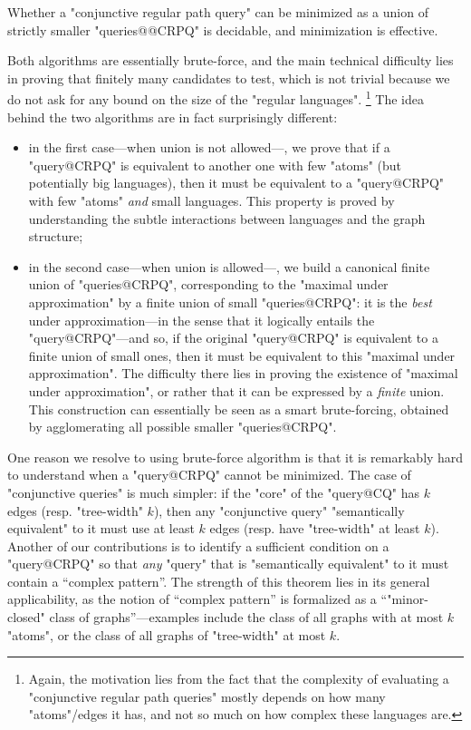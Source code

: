 \begin{contribution}
	Whether a "conjunctive regular path query" can be minimized
	as a union of strictly smaller "queries@@CRPQ" is decidable,
	and minimization is effective.
\end{contribution}

Both algorithms are essentially brute-force, and the main technical difficulty
lies in proving that finitely many candidates to test, which is not
trivial because we do not ask for any bound on the size of the "regular languages".%
\footnote{Again, the motivation lies from the fact that the complexity of evaluating
a "conjunctive regular path queries" mostly depends on how many "atoms"/edges it has,
and not so much on how complex these languages are.}
The idea behind the two algorithms are in fact surprisingly different:
\begin{itemize}
	\item in the first case---when union is not allowed---, we prove that
		if a "query@CRPQ" is equivalent to another one with few
		"atoms" (but potentially big languages), then it must be
		equivalent to a "query@CRPQ" with few "atoms" \emph{and} small languages.
		This property is proved by understanding the subtle interactions between
		languages and the graph structure;
	\item in the second case---when union is allowed---, we build a canonical
		finite union of "queries@CRPQ", corresponding to the
		"maximal under approximation" by a finite union of small "queries@CRPQ": 
		it is the \emph{best} under approximation---in the sense that
		it logically entails the "query@CRPQ"---and so, if the original
		"query@CRPQ" is equivalent to a finite union of small ones, then
		it must be equivalent to this "maximal under approximation".
		The difficulty there lies in proving the existence of "maximal under approximation",
		or rather that it can be expressed by a \emph{finite} union.
		This construction can essentially be seen as a
		smart brute-forcing, obtained by agglomerating all possible smaller "queries@CRPQ".
\end{itemize}

One reason we resolve to using brute-force algorithm is that it is
remarkably hard to understand when a "query@CRPQ" cannot be minimized.
The case of "conjunctive queries" is much simpler: if the "core" 
of the "query@CQ" has $k$ edges (resp. "tree-width" $k$),
then any "conjunctive query" "semantically equivalent" to it must use at least $k$ edges
(resp. have "tree-width" at least $k$).
Another of our contributions is to identify a sufficient condition
on a "query@CRPQ" so that \emph{any} "query" that is "semantically equivalent" to it
must contain a ``complex pattern''. The strength of this theorem lies in its
general applicability, as the notion of ``complex pattern''
is formalized as a ``"minor-closed" class
of graphs''---examples include the class of all graphs with at most $k$ "atoms",
or the class of all graphs of "tree-width" at most $k$.

